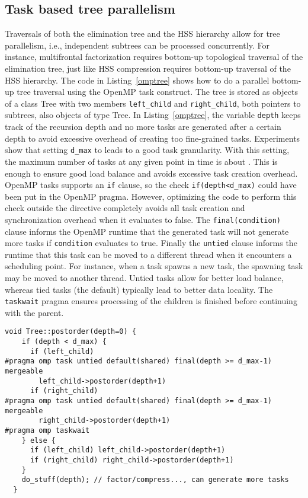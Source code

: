 \documentclass{article}
\begin{document}
\subsection{Task based tree parallelism}
Traversals of both the elimination tree and the HSS hierarchy allow
for tree parallelism, i.e., independent subtrees can be processed
concurrently. For instance, multifrontal factorization requires
bottom-up topological traversal of the elimination tree, just like HSS
compression requires bottom-up traversal of the HSS hierarchy. The
code in Listing~\ref{omptree} shows how to do a parallel bottom-up
tree traversal using the OpenMP task construct. The tree is stored as
objects of a class Tree with two members \verb+left_child+ and
\verb+right_child+, both pointers to subtrees, also objects of type
Tree. In Listing~\ref{omptree}, the variable \verb+depth+ keeps track
of the recursion depth and no more tasks are generated after a certain
depth to avoid excessive overhead of creating too fine-grained
tasks. Experiments show that setting \verb+d_max+ to
 leads to a good task granularity. With
this setting, the maximum number of tasks at any given point in time
is about . This is
enough to ensure good load balance and avoids excessive task creation
overhead. OpenMP tasks supports an \verb+if+ clause, so the check
\verb+if(depth<d_max)+ could have been put in the OpenMP
pragma. However, optimizing the code to perform this check outside the
directive completely avoids all task creation and synchronization
overhead when it evaluates to false. The \verb+final(condition)+
clause informs the OpenMP runtime that the generated task will not
generate more tasks if \verb+condition+ evaluates to true. Finally the
\verb+untied+ clause informs the runtime that this task can be moved
to a different thread when it encounters a scheduling point. For
instance, when a task spawns a new task, the spawning task may be
moved to another thread. Untied tasks allow for better load balance,
whereas tied tasks (the default) typically lead to better data
locality. The \verb+taskwait+ pragma ensures processing of the
children is finished before continuing with the parent.
\begin{lstlisting}[label=omptree,frame=single,captionpos=b,float,
  caption={Bottom-up topological parallel tree traversal implemented with recursion and the OpenMP~(3.1) task construct.}]
  void Tree::postorder(depth=0) {
    if (depth < d_max) {
      if (left_child)
#pragma omp task untied default(shared) final(depth >= d_max-1) mergeable
        left_child->postorder(depth+1)
      if (right_child)
#pragma omp task untied default(shared) final(depth >= d_max-1) mergeable
        right_child->postorder(depth+1)
#pragma omp taskwait
    } else {
      if (left_child) left_child->postorder(depth+1)
      if (right_child) right_child->postorder(depth+1)
    }
    do_stuff(depth); // factor/compress..., can generate more tasks
  }  
\end{lstlisting}
\end{document}
